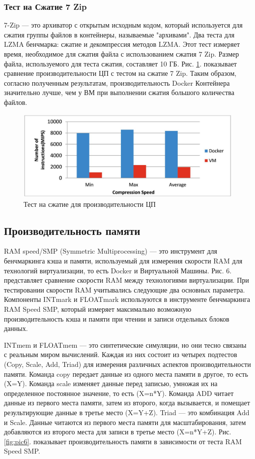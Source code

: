 \documentclass{mirea}
\begin{document}
	\subsubsection{Тест на Сжатие 7 Zip}
	
	7-Zip — это архиватор с открытым исходным кодом, который используется для сжатия группы файлов в контейнеры, называемые "архивами". Два теста для LZMA бенчмарка: сжатие и декомпрессия методов LZMA. Этот тест измеряет время, необходимое для сжатия файла с использованием сжатия 7 Zip. Размер файла, используемого для теста сжатия, составляет 10 ГБ. Рис. \ref{fig:pic5}. показывает сравнение производительности ЦП с тестом на сжатие 7 Zip. Таким образом, согласно полученным результатам, производительность Docker Контейнера значительно лучше, чем у ВМ при выполнении сжатия большого количества файлов.
	
	\begin{figure}[H]
		\centering
		\includegraphics[width=.6\textwidth]{img5}
		\parskip=6pt
		\caption{Тест на сжатие для производительности ЦП}
		\label{fig:pic5}
	\end{figure}

	\subsection{Производительность памяти}
	
	RAM speed/SMP (Symmetric Multiprocessing) — это инструмент для бенчмаркинга кэша и памяти, используемый для измерения скорости RAM для технологий виртуализации, то есть Docker и Виртуальной Машины. Рис. 6. представляет сравнение скорости RAM между технологиями виртуализации. При тестировании скорости RAM учитывались следующие два основных параметра. Компоненты INTmark и FLOATmark используются в инструменте бенчмаркинга RAM Speed SMP, который измеряет максимально возможную производительность кэша и памяти при чтении и записи отдельных блоков данных.
	
	INTmem и FLOATmem — это синтетические симуляции, но они тесно связаны с реальным миром вычислений. Каждая из них состоит из четырех подтестов (Copy, Scale, Add, Triad) для измерения различных аспектов производительности памяти. Команда copy передает данные из одного места памяти в другое, то есть (X=Y). Команда scale изменяет данные перед записью, умножая их на определенное постоянное значение, то есть (X=n*Y). Команда ADD читает данные из первого места памяти, затем из второго, когда вызывается, и помещает результирующие данные в третье место (X=Y+Z). Triad — это комбинация Add и Scale. Данные читаются из первого места памяти для масштабирования, затем добавляются из второго места для записи в третье место (X=n*Y+Z). Рис. \ref{fig:pic6}. показывает производительность памяти в зависимости от теста RAM Speed SMP.
	
\end{document}
